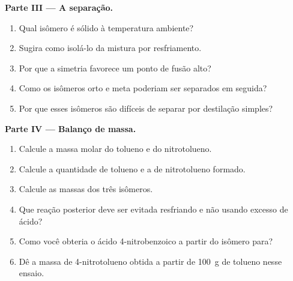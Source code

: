 \begin{problem}
\medskip
\noindent\textbf{Parte III --- A separação.}
\begin{enumerate}[resume]
  \item Qual isômero é sólido à temperatura ambiente?
  \item Sugira como isolá-lo da mistura por resfriamento.
  \item Por que a simetria favorece um ponto de fusão alto?
  \item Como os isômeros orto e meta poderiam ser separados em seguida?
  \item Por que esses isômeros são difíceis de separar por destilação simples?
\end{enumerate}

\medskip
\noindent\textbf{Parte IV --- Balanço de massa.}
\begin{enumerate}[resume]
  \item Calcule a massa molar do tolueno e do nitrotolueno.
  \item Calcule a quantidade de tolueno e a de nitrotolueno formado.
  \item Calcule as massas dos três isômeros.
  \item Que reação posterior deve ser evitada resfriando e não usando excesso de ácido?
  \item Como você obteria o ácido 4-nitrobenzoico a partir do isômero para?
  \item Dê a massa de 4-nitrotolueno obtida a partir de \qty{100}{g} de tolueno nesse ensaio.
\end{enumerate}
\end{problem}
